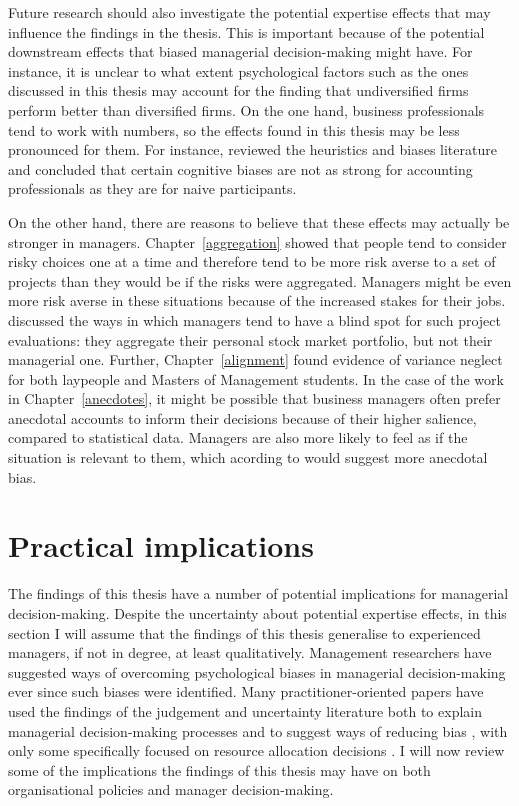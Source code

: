 \documentclass[a4paper, nobind, dvipsnames]{templates/ociamthesis}
\theoremstyle{definition}
\theoremstyle{definition}
\theoremstyle{definition}
\theoremstyle{definition}
\theoremstyle{remark}
\begin{document}
Future research should also investigate the potential expertise effects that may
influence the findings in the thesis. This is important because of the potential
downstream effects that biased managerial decision-making might have. For
instance, it is unclear to what extent psychological factors such as the ones
discussed in this thesis may account for the finding that undiversified firms
perform better than diversified firms. On the one hand, business professionals
tend to work with numbers, so the effects found in this thesis may be less
pronounced for them. For instance, \textcite{smith1991} reviewed the heuristics and biases
literature and concluded that certain cognitive biases are not as strong for
accounting professionals as they are for naive participants.

On the other hand, there are reasons to believe that these effects may actually
be stronger in managers. Chapter~\ref{aggregation} showed that people tend to
consider risky choices one at a time and therefore tend to be more risk averse
to a set of projects than they would be if the risks were aggregated. Managers
might be even more risk averse in these situations because of the increased
stakes for their jobs. \textcite{lovallo2020} discussed the ways in which managers tend to
have a blind spot for such project evaluations: they aggregate their personal
stock market portfolio, but not their managerial one. Further,
Chapter~\ref{alignment} found evidence of variance neglect for both laypeople
and Masters of Management students. In the case of the work in
Chapter~\ref{anecdotes}, it might be possible that business managers often
prefer anecdotal accounts to inform their decisions because of their higher
salience, compared to statistical data. Managers are also more likely to feel as
if the situation is relevant to them, which acording to \textcite{freling2020} would
suggest more anecdotal bias.

\section{Practical implications}

The findings of this thesis have a number of potential implications for
managerial decision-making. Despite the uncertainty about potential expertise
effects, in this section I will assume that the findings of this thesis
generalise to experienced managers, if not in degree, at least qualitatively.
Management researchers have suggested ways of overcoming psychological biases in
managerial decision-making ever since such biases were identified. Many
practitioner-oriented papers have used the findings of the judgement and
uncertainty literature both to explain managerial decision-making processes and
to suggest ways of reducing bias \autocite{lovallo2014,koller2012,hall2012,courtney1997,courtney2013,sibony2017}, with only some specifically focused
on resource allocation decisions \autocite{birshan2013}. I will now review some of the
implications the findings of this thesis may have on both organisational
policies and manager decision-making.
\end{document}
